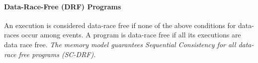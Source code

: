         \paragraph{Data-Race-Free (DRF) Programs}
            An execution is considered data-race free if none of the above conditions for data-races occur among events. A program is data-race free if all its executions are data race free.          
            \textit{The memory model guarantees Sequential Consistency for all data-race free programs (SC-DRF).}
        